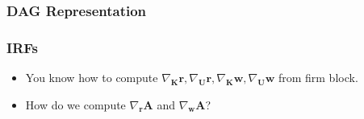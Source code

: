 \documentclass[english,xcolor=svgnames]{beamer}
\begin{document}
\begin{frame}
    \frametitle{DAG Representation}
    
\end{frame}

\begin{frame}
    \frametitle{IRFs}
    \begin{itemize}
        \item You know how to compute $\nabla_{\mathbf{K}}\pmb{\mathbf{r}}, \nabla_{\mathbf{U}}\pmb{\mathbf{r}}, \nabla_{\bm{K}}\pmb{\mathbf{w}}, \nabla_{\bm{U}}\pmb{\mathbf{w}}$ from firm block.
        \item How do we compute $\nabla_{\mathbf{r}}\mathbf{A}$ and $\nabla_{\mathbf{w}}\mathbf{A}$?
	\end{itemize}
\end{frame}

\end{document}
